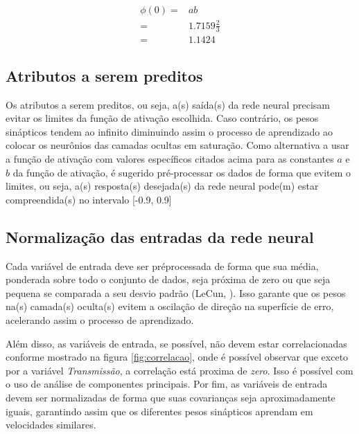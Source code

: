 \begin{align*}
\phi(0) = & ab \\
= & 1.7159 \frac{2}{3} \\
= & 1.1424        
\end{align*}

\subsection{Atributos a serem preditos}
Os atributos a serem preditos, ou seja, a(s) saída(s) da rede neural precisam evitar os limites da função de ativação escolhida. Caso contrário, os pesos sinápticos tendem ao infinito diminuindo assim o processo de aprendizado ao colocar os neurônios das camadas ocultas em saturação. Como alternativa a usar a função de ativação com valores específicos citados acima para as constantes $a$ e $b$ da função de ativação, é sugerido pré-processar os dados de forma que evitem o limites, ou seja, a(s) resposta(s) desejada(s) da rede neural pode(m) estar compreendida(s) no intervalo [-0.9, 0.9]

\subsection{Normalização das entradas da rede neural}
Cada variável de entrada deve ser préprocessada de forma que sua média, ponderada sobre todo o conjunto de dados, seja próxima de zero ou que seja pequena se comparada a seu desvio padrão (LeCun,  \citeyear{lecun1993efficient}). Isso garante que os pesos na(s) camada(s) oculta(s) evitem a oscilação de direção na superfície de erro, acelerando assim o processo de aprendizado.

Além disso, as variáveis de entrada, se possível, não devem estar correlacionadas conforme mostrado na figura \ref{fig:correlacao}, onde é possível observar que exceto por a variável \textit{Transmissão}, a correlação está proxima de \textit{zero}. Isso é possível com o uso de análise de componentes principais.
Por fim, as variáveis de entrada devem ser normalizadas de forma que suas covarianças seja aproximadamente iguais, garantindo assim que os diferentes pesos sinápticos aprendam em velocidades similares.

